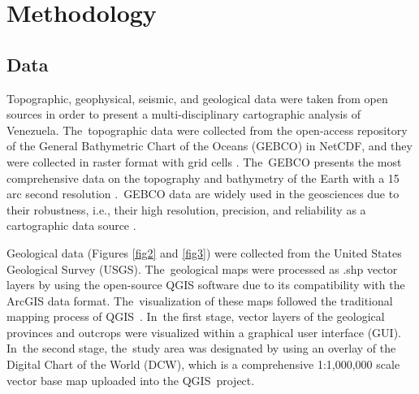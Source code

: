 \documentclass[sustainability,article,accept,pdftex,moreauthors]{Definitions/mdpi}
\begin{document}
\section{Methodology}
\unskip

\subsection{Data}
Topographic, geophysical, seismic, and geological data{ }were taken {from  open sources }in order to present a multi-disciplinary cartographic analysis of Venezuela. The~topographic data were collected {from }the open-access repository {of the }General Bathymetric Chart of the Oceans (GEBCO) {in }NetCDF, and they were collected {in }raster {format with }grid {cells }\cite{GEBCO}{. The~GEBCO }presents the most comprehensive data on the topography and bathymetry of the Earth {with a 15 arc second resolution } \cite{Schenke}.~GEBCO data{ are }widely used in the geosciences due to their {robustness, i.e., their high }resolution{, }precision,{ and reliability as a cartographic data source }\citep{Mcmichael,Cortina}. 

Geological data (Figures \ref{fig2} and \ref{fig3}) were {collected from the United States Geological Survey (USGS). The~geological maps were processed as .shp vector layers} by using{ }the {open-source QGIS software due to its} compatibility{ }with the ArcGIS data format. The~visualization of these maps followed the traditional mapping process of  QGIS~\cite{Lemenkova2022a}. In~the first stage, vector layers of the geological provinces and outcrops were visualized within a graphical user interface (GUI). In~the second stage, the~study area was designated by using an overlay of the Digital Chart of the World (DCW), which is a comprehensive 1:1,000,000 scale vector base map uploaded into the QGIS~project. 

\end{document}
